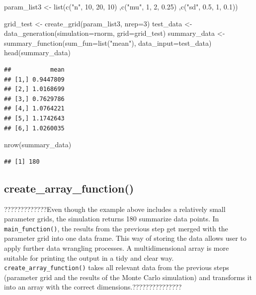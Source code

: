 \documentclass[11pt,a4paper]{article}
\newenvironment{Shaded}{\begin{snugshade}}{\end{snugshade}}
\newcommand{\AttributeTok}[1]{\textcolor[rgb]{0.77,0.63,0.00}{#1}}
\newcommand{\DecValTok}[1]{\textcolor[rgb]{0.00,0.00,0.81}{#1}}
\newcommand{\FloatTok}[1]{\textcolor[rgb]{0.00,0.00,0.81}{#1}}
\newcommand{\FunctionTok}[1]{\textcolor[rgb]{0.00,0.00,0.00}{#1}}
\newcommand{\NormalTok}[1]{#1}
\newcommand{\OtherTok}[1]{\textcolor[rgb]{0.56,0.35,0.01}{#1}}
\newcommand{\StringTok}[1]{\textcolor[rgb]{0.31,0.60,0.02}{#1}}
\begin{document}
\begin{Shaded}
\begin{Highlighting}[]
\NormalTok{param\_list3 }\OtherTok{\textless{}{-}} \FunctionTok{list}\NormalTok{(}\FunctionTok{c}\NormalTok{(}\StringTok{"n"}\NormalTok{, }\DecValTok{10}\NormalTok{, }\DecValTok{20}\NormalTok{, }\DecValTok{10}\NormalTok{)}
\NormalTok{                    ,}\FunctionTok{c}\NormalTok{(}\StringTok{"mu"}\NormalTok{, }\DecValTok{1}\NormalTok{, }\DecValTok{2}\NormalTok{, }\FloatTok{0.25}\NormalTok{)}
\NormalTok{                    ,}\FunctionTok{c}\NormalTok{(}\StringTok{"sd"}\NormalTok{, }\FloatTok{0.5}\NormalTok{, }\DecValTok{1}\NormalTok{, }\FloatTok{0.1}\NormalTok{))}

\NormalTok{grid\_test }\OtherTok{\textless{}{-}} \FunctionTok{create\_grid}\NormalTok{(param\_list3, }\AttributeTok{nrep=}\DecValTok{3}\NormalTok{)}
\NormalTok{test\_data }\OtherTok{\textless{}{-}} \FunctionTok{data\_generation}\NormalTok{(}\AttributeTok{simulation=}\NormalTok{rnorm, }\AttributeTok{grid=}\NormalTok{grid\_test)}
\NormalTok{summary\_data }\OtherTok{\textless{}{-}} \FunctionTok{summary\_function}\NormalTok{(}\AttributeTok{sum\_fun=}\FunctionTok{list}\NormalTok{(}\StringTok{"mean"}\NormalTok{),}
                                 \AttributeTok{data\_input=}\NormalTok{test\_data)}
\FunctionTok{head}\NormalTok{(summary\_data)}
\end{Highlighting}
\end{Shaded}

\begin{verbatim}
##           mean
## [1,] 0.9447809
## [2,] 1.0168699
## [3,] 0.7629786
## [4,] 1.0764221
## [5,] 1.1742643
## [6,] 1.0260035
\end{verbatim}

\begin{Shaded}
\begin{Highlighting}[]
\FunctionTok{nrow}\NormalTok{(summary\_data)}
\end{Highlighting}
\end{Shaded}

\begin{verbatim}
## [1] 180
\end{verbatim}

\hypertarget{create_array_function}{%
\subsection{create\_array\_function()}\label{create_array_function}}

?????????????Even though the example above includes a relatively small
parameter grids, the simulation returns 180 summarize data points. In
\texttt{main\_function()}, the results from the previous step get merged
with the parameter grid into one data frame. This way of storing the
data allows user to apply further data wrangling processes. A
multidimensional array is more suitable for printing the output in a
tidy and clear way. \texttt{create\_array\_function()} takes all
relevant data from the previous steps (parameter grid and the results of
the Monte Carlo simulation) and transforms it into an array with the
correct dimensions.???????????????
\end{document}
